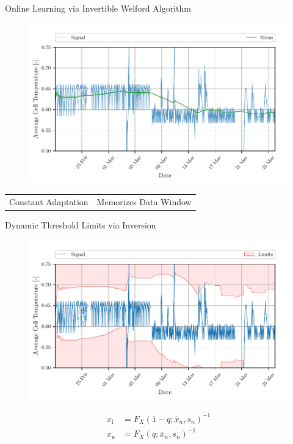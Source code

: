 \documentclass[aspectratio=169]{beamer}
\newcommand{\ui}[2]{#1 _{\mathrm{#2}}}
\begin{document}
\begin{frame}{Online Learning via Invertible Welford Algorithm}
    \begin{figure}
        \begin{center}
            \includegraphics[width=0.62\linewidth]{../ilustrate/pc2023/bess/rmean_signal.pdf}
        \end{center}
    \end{figure}
    \begin{table}
        \centering
        \begin{tabular}{c|c}
            {\color{green}{$+$}} Constant Adaptation & {\color{red}{$-$}} Memorizes Data Window \\
        \end{tabular}
    \end{table}
\end{frame}

\begin{frame}{Dynamic Threshold Limits via Inversion}
    \begin{figure}
        \begin{center}
            \includegraphics[width=0.62\linewidth]{../ilustrate/pc2023/bess/thresh_unsupervised_thresh.pdf}
        \end{center}
    \end{figure}
    \begin{align*}
        \ui{x}{l} & = F_{X}(1 - q; \bar x_n, s_n)^{-1} \\
        \ui{x}{u} & = F_{X}(q; \bar x_n, s_n)^{-1}
    \end{align*}
\end{frame}
\end{document}
